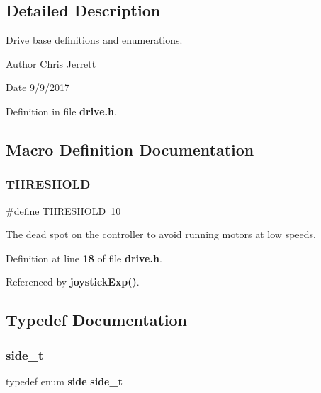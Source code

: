 \subsection{Detailed Description}
Drive base definitions and enumerations. 

\begin{DoxyAuthor}{Author}
Chris Jerrett 
\end{DoxyAuthor}
\begin{DoxyDate}{Date}
9/9/2017 
\end{DoxyDate}


Definition in file \textbf{ drive.\+h}.



\subsection{Macro Definition Documentation}
\mbox{\label{drive_8h_a4679d8ea8690999a6c6c7c0cb245c879}} 
\subsubsection{T\+H\+R\+E\+S\+H\+O\+LD}
{\footnotesize\ttfamily \#define T\+H\+R\+E\+S\+H\+O\+LD~10}



The dead spot on the controller to avoid running motors at low speeds. 



Definition at line \textbf{ 18} of file \textbf{ drive.\+h}.



Referenced by \textbf{ joystick\+Exp()}.



\subsection{Typedef Documentation}
\mbox{\label{drive_8h_a9df2afd2f1acb97019655e5e730609c7}} 
\subsubsection{side\+\_\+t}
{\footnotesize\ttfamily typedef enum \textbf{ side}  \textbf{ side\+\_\+t}}



